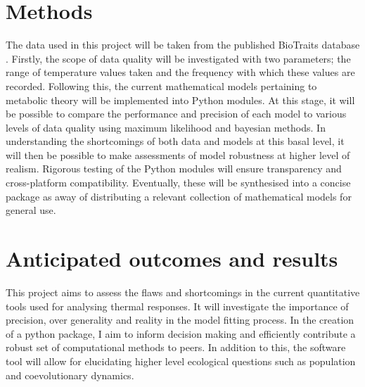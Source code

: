 \documentclass[
11pt, %
onehalfspacing, %
parskip, %
headsepline, %
]{article} %
\begin{document}
\begin{linenumbers}
\section*{Methods}
The data used in this project will be taken from the published BioTraits database \citep{Dell2013}. Firstly, the scope of data quality will be investigated with two parameters; the range of temperature values taken and the frequency with which these values are recorded. Following this, the current mathematical models pertaining to metabolic theory will be implemented into Python modules. At this stage, it will be possible to compare the performance and precision of each model to various levels of data quality using maximum likelihood and bayesian methods. In understanding the shortcomings of both data and models at this basal level, it will then be possible to make assessments of model robustness at higher level of realism. Rigorous testing of the Python modules will ensure transparency and cross-platform compatibility. Eventually, these will be synthesised into a concise package as away of distributing a relevant collection of mathematical models for general use.

\maketitle
\section*{Anticipated outcomes and results}
This project aims to assess the flaws and shortcomings in the current quantitative tools used for analysing thermal responses. It will investigate the importance of precision, over generality and reality in the model fitting process. In the creation of a python package, I aim to inform decision making and efficiently contribute a robust set of computational methods to peers. In addition to this, the software tool will allow for elucidating higher level ecological questions such as population and coevolutionary dynamics.

\maketitle

\end{linenumbers}
\end{document}
